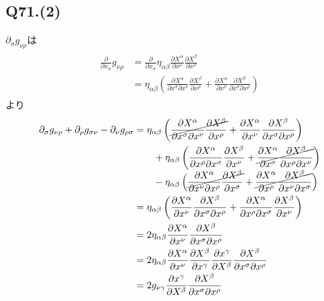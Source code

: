 \documentclass[uplatex,a4j,11pt,dvipdfmx]{jsarticle}
\begin{document}
\subsection*{Q71.(2)}
$\partial_\sigma g_{\nu\rho}$は
\begin{align}
  \begin{split}
    \frac{\partial}{\partial x_\sigma}g_{\nu\rho}&=\frac{\partial}{\partial x_\sigma}\eta_{\alpha\beta}\frac{\partial X^{\alpha}}{\partial x^\nu}\frac{\partial X^{\beta}}{\partial x^\rho}\\
    &=\eta_{\alpha\beta}\left(\frac{\partial X^\alpha}{\partial x^\sigma\partial x^\nu}\frac{\partial X^\beta}{\partial x^\rho}+\frac{\partial X^\alpha}{\partial x^\nu}\frac{\partial X^\beta}{\partial x^\sigma\partial x^\rho}\right)
  \end{split}
\end{align}
より
\begin{align}
  \begin{split}
    \partial_\sigma g_{\nu\rho}+\partial_\rho g_{\sigma\nu}-\partial_\nu g_{\rho\sigma}
    &=\eta_{\alpha\beta}\left(\cancel{\frac{\partial X^\alpha}{\partial x^\sigma\partial x^\nu}\frac{\partial X^\beta}{\partial x^\rho}} + \frac{\partial X^\alpha}{\partial x^\nu}\frac{\partial X^\beta}{\partial x^\sigma\partial x^\rho}\right)\\
    &\qquad+\eta_{\alpha\beta}\left(\frac{\partial X^\alpha}{\partial x^\rho\partial x^\sigma}\frac{\partial X^\beta}{\partial x^\nu} + \cancel{\frac{\partial X^\alpha}{\partial x^\sigma}\frac{\partial X^\beta}{\partial x^\rho\partial x^\nu}}\right)\\
    &\qquad-\eta_{\alpha\beta}\left(\cancel{\frac{\partial X^\alpha}{\partial x^\nu\partial x^\rho}\frac{\partial X^\beta}{\partial x^\sigma}} + \cancel{\frac{\partial X^\alpha}{\partial x^\rho}\frac{\partial X^\beta}{\partial x^\nu\partial x^\sigma}}\right)\\
    &=\eta_{\alpha\beta}\left(\frac{\partial X^\alpha}{\partial x^\nu}\frac{\partial X^\beta}{\partial x^\sigma\partial x^\rho} + \frac{\partial X^\alpha}{\partial x^\rho\partial x^\sigma}\frac{\partial X^\beta}{\partial x^\nu}\right)\\
    &=2\eta_{\alpha\beta}\frac{\partial X^\alpha}{\partial x^\nu}\frac{\partial X^\beta}{\partial x^\sigma\partial x^\rho}\\
    &=2\eta_{\alpha\beta}\frac{\partial X^\alpha}{\partial x^\nu}\frac{\partial X^\beta}{\partial x^\gamma}\frac{\partial x^\gamma}{\partial X^\beta}\frac{\partial X^\beta}{\partial x^\sigma\partial x^\rho}\\
    &=2g_{\nu\gamma}\frac{\partial x^\gamma}{\partial X^\beta}\frac{\partial X^\beta}{\partial x^\sigma\partial x^\rho}
  \end{split}
\end{align}
\end{document}
